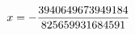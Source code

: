 \documentclass[preview]{standalone}
\begin{document}
\begin{align*}
\special{dvisvgm:raw <g id='unique000'>}x = - \frac{3940649673949184}{825659931684591}\special{dvisvgm:raw </g>}
\end{align*}
\end{document}
